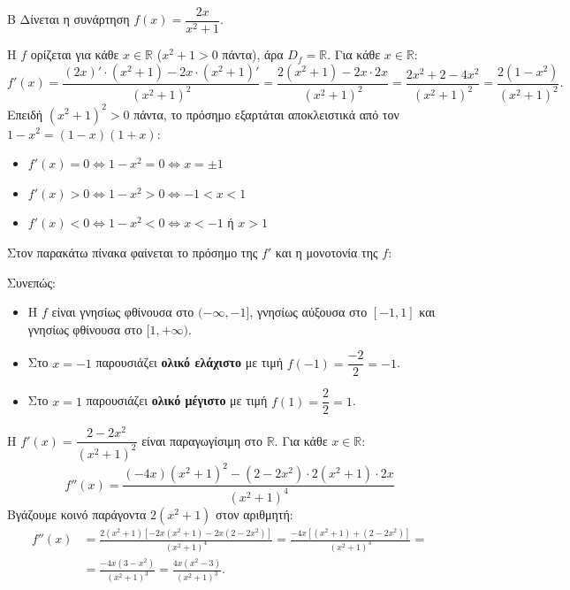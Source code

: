 \begin{thema}{Β}
Δίνεται η συνάρτηση $f(x)=\dfrac{2x}{x^2+1}$.

\begin{erwthma}

\item Η $f$ ορίζεται για κάθε $x\in\mathbb{R}$ ($x^2+1>0$ πάντα), άρα $D_f=\mathbb{R}$. Για κάθε $x\in\mathbb{R}$:
\[
f'(x)=\frac{(2x)'\cdot(x^2+1)-2x\cdot(x^2+1)'}{(x^2+1)^2}
=\frac{2(x^2+1)-2x\cdot2x}{(x^2+1)^2}
=\frac{2x^2+2-4x^2}{(x^2+1)^2}
=\frac{2(1-x^2)}{(x^2+1)^2}.
\]
Επειδή $(x^2+1)^2>0$ πάντα, το πρόσημο εξαρτάται αποκλειστικά από τον $1-x^2=(1-x)(1+x)$:
\begin{itemize}
    \item $f'(x)=0\Leftrightarrow 1-x^2=0\Leftrightarrow x=\pm1$
    \item $f'(x)>0\Leftrightarrow 1-x^2>0\Leftrightarrow -1<x<1$
    \item $f'(x)<0\Leftrightarrow 1-x^2<0\Leftrightarrow x<-1$ ή $x>1$
\end{itemize}
Στον παρακάτω πίνακα φαίνεται το πρόσημο της $f'$ και η μονοτονία της $f$:
\begin{center}
\end{center}
Συνεπώς:
\begin{itemize}
    \item Η $f$ είναι γνησίως φθίνουσα στο $(-\infty,-1]$, γνησίως αύξουσα στο $[-1,1]$ και γνησίως φθίνουσα στο $[1,+\infty)$.
    \item Στο $x=-1$ παρουσιάζει \textbf{ολικό ελάχιστο} με τιμή $f(-1)=\dfrac{-2}{2}=-1$.
    \item Στο $x=1$ παρουσιάζει \textbf{ολικό μέγιστο} με τιμή $f(1)=\dfrac{2}{2}=1$.
\end{itemize}

\item Η $f'(x)=\dfrac{2-2x^2}{(x^2+1)^2}$ είναι παραγωγίσιμη στο $\mathbb{R}$.
Για κάθε $x\in\mathbb{R}$:
\[
f''(x)=\frac{(-4x)(x^2+1)^2-(2-2x^2)\cdot2(x^2+1)\cdot2x}{(x^2+1)^4}
\]
Βγάζουμε κοινό παράγοντα $2(x^2+1)$ στον αριθμητή:
\begin{align*}
f''(x)&=\frac{2(x^2+1)\left[-2x(x^2+1)-2x(2-2x^2)\right]}{(x^2+1)^4}
=\frac{-4x\left[(x^2+1)+(2-2x^2)\right]}{(x^2+1)^3}=\\&=\frac{-4x(3-x^2)}{(x^2+1)^3}
=\frac{4x(x^2-3)}{(x^2+1)^3}.
\end{align*}



\end{erwthma}
\end{thema}
